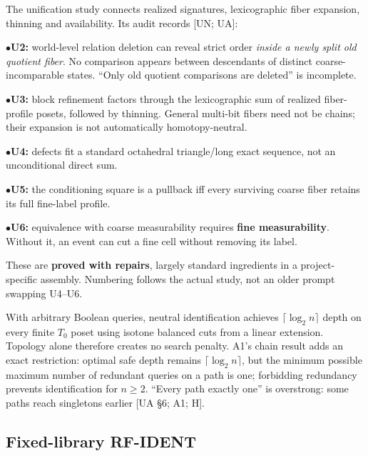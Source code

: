 \documentclass[10pt,letterpaper]{article}
\begin{document}
The unification study connects realized signatures, lexicographic fiber expansion, thinning and availability. Its audit records [UN; UA]:\par

\noindent$\bullet$\quad \textbf{U2:} world-level relation deletion can reveal strict order \emph{inside a newly split old quotient fiber}. No comparison appears between descendants of distinct coarse-incomparable states. ``Only old quotient comparisons are deleted'' is incomplete.\par
\noindent$\bullet$\quad \textbf{U3:} block refinement factors through the lexicographic sum of realized fiber-profile posets, followed by thinning. General multi-bit fibers need not be chains; their expansion is not automatically homotopy-neutral.\par
\noindent$\bullet$\quad \textbf{U4:} defects fit a standard octahedral triangle/long exact sequence, not an unconditional direct sum.\par
\noindent$\bullet$\quad \textbf{U5:} the conditioning square is a pullback iff every surviving coarse fiber retains its full fine-label profile.\par
\noindent$\bullet$\quad \textbf{U6:} equivalence with coarse measurability requires \textbf{fine measurability}. Without it, an event can cut a fine cell without removing its label.\par

These are \textbf{proved with repairs}, largely standard ingredients in a project-specific assembly. Numbering follows the actual study, not an older prompt swapping U4--U6.\par

With arbitrary Boolean queries, neutral identification achieves \(\lceil\log_2n\rceil\) depth on every finite \(T_0\) poset using isotone balanced cuts from a linear extension. Topology alone therefore creates no search penalty. A1's chain result adds an exact restriction: optimal safe depth remains \(\lceil\log_2n\rceil\), but the minimum possible maximum number of redundant queries on a path is one; forbidding redundancy prevents identification for \(n\ge2\). ``Every path exactly one'' is overstrong: some paths reach singletons earlier [UA \S{}6; A1; H].\par

\subsection*{Fixed-library RF-IDENT}
\end{document}
